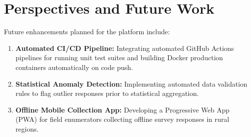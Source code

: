 \documentclass[12pt,a4paper]{report}
\begin{document}
\section*{Perspectives and Future Work}
Future enhancements planned for the platform include:
\begin{enumerate}
    \item \textbf{Automated CI/CD Pipeline:} Integrating automated GitHub Actions pipelines for running unit test suites and building Docker production containers automatically on code push.
    \item \textbf{Statistical Anomaly Detection:} Implementing automated data validation rules to flag outlier responses prior to statistical aggregation.
    \item \textbf{Offline Mobile Collection App:} Developing a Progressive Web App (PWA) for field enumerators collecting offline survey responses in rural regions.
\end{enumerate}
\end{document}
